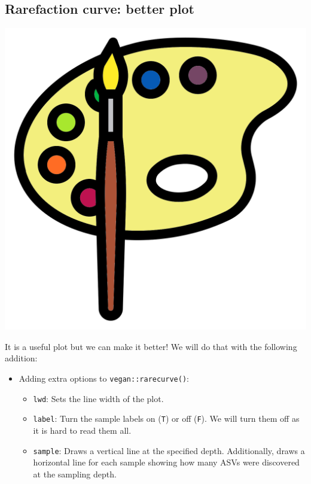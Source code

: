 \documentclass[
]{book}
\providecommand{\tightlist}{%
  \setlength{\itemsep}{0pt}\setlength{\parskip}{0pt}}
\begin{document}
\hypertarget{rarefaction-curve-better-plot}{%
\subsection{Rarefaction curve: better plot}\label{rarefaction-curve-better-plot}}

\includegraphics{figures/palette_brush.png}

It is a useful plot but we can make it better!
We will do that with the following addition:

\begin{itemize}
\tightlist
\item
  Adding extra options to \texttt{vegan::rarecurve()}:

  \begin{itemize}
  \tightlist
  \item
    \texttt{lwd}: Sets the line width of the plot.
  \item
    \texttt{label}: Turn the sample labels on (\texttt{T}) or off (\texttt{F}). We will turn them off as it is hard to read them all.
  \item
    \texttt{sample}: Draws a vertical line at the specified depth.
    Additionally, draws a horizontal line for each sample showing
    how many ASVs were discovered at the sampling depth.
  \end{itemize}
\end{itemize}
\end{document}
